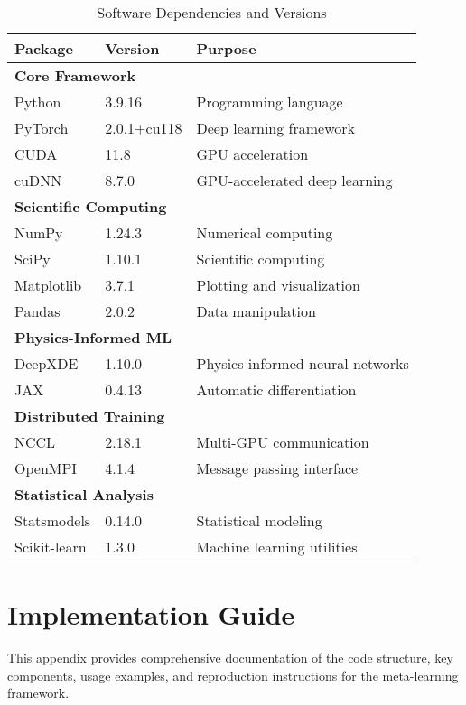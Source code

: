 \documentclass[review]{elsarticle}
\begin{document}
\begin{table}[H]
\centering
\caption{Software Dependencies and Versions}
\small
\begin{tabular}{lll}
\toprule
\textbf{Package} & \textbf{Version} & \textbf{Purpose} \\
\midrule
\multicolumn{3}{l}{\textbf{Core Framework}} \\
Python & 3.9.16 & Programming language \\
PyTorch & 2.0.1+cu118 & Deep learning framework \\
CUDA & 11.8 & GPU acceleration \\
cuDNN & 8.7.0 & GPU-accelerated deep learning \\
\midrule
\multicolumn{3}{l}{\textbf{Scientific Computing}} \\
NumPy & 1.24.3 & Numerical computing \\
SciPy & 1.10.1 & Scientific computing \\
Matplotlib & 3.7.1 & Plotting and visualization \\
Pandas & 2.0.2 & Data manipulation \\
\midrule
\multicolumn{3}{l}{\textbf{Physics-Informed ML}} \\
DeepXDE & 1.10.0 & Physics-informed neural networks \\
JAX & 0.4.13 & Automatic differentiation \\
\midrule
\multicolumn{3}{l}{\textbf{Distributed Training}} \\
NCCL & 2.18.1 & Multi-GPU communication \\
OpenMPI & 4.1.4 & Message passing interface \\
\midrule
\multicolumn{3}{l}{\textbf{Statistical Analysis}} \\
Statsmodels & 0.14.0 & Statistical modeling \\
Scikit-learn & 1.3.0 & Machine learning utilities \\
\bottomrule
\end{tabular}
\end{table}

\section{Implementation Guide}
\label{appendix:implementation_guide}

This appendix provides comprehensive documentation of the code structure, key components, usage examples, and reproduction instructions for the meta-learning framework.
\end{document}
